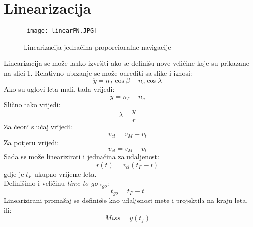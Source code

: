 \section{Linearizacija}
\begin{figure}[h!]
    \centering
    \texttt{[image: linearPN.JPG]}
    \caption{Linearizacija jednačina proporcionalne navigacije}
    \label{fig:linear}
\end{figure}

Linearizacija se može lahko izvršiti ako se definišu nove veličine koje su prikazane na slici \ref{fig:linear}.
Relativno ubrzanje se može odrediti sa slike i iznosi:
\begin{equation}
    \ddot{y}=n_T\cos\beta-n_c\cos\lambda
\end{equation}
Ako su uglovi leta mali, tada vrijedi:
\begin{equation}
    \ddot{y}=n_T-n_c
\end{equation}
Slično tako vrijedi:
\begin{equation}
    \lambda = \frac{y}{r}
\end{equation}
Za čeoni slučaj vrijedi:
\begin{equation}
    v_{cl}=v_M+v_t
\end{equation}
Za potjeru vrijedi:
\begin{equation}
    v_{cl}=v_M-v_t
\end{equation}
Sada se može linearizirati i jednačina za udaljenost:
\begin{equation}
    r(t)=v_{cl}(t_F-t)
\end{equation}
gdje je $t_F$ ukupno vrijeme leta.\\
Definišimo i veličinu \textit{time to go} $t_{go}$:
\begin{equation}
    t_{go}=t_F-t
\end{equation}
Linearizirani promašaj se definisše kao udaljenost mete i projektila na kraju leta, ili:
\begin{equation}
    Miss=y(t_f)
\end{equation}

